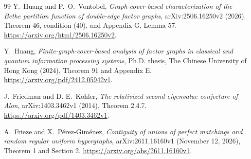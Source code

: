\begin{thebibliography}{99}
Y.~Huang and P.~O.~Vontobel,
\emph{Graph-cover-based characterization of the Bethe partition function
of double-edge factor graphs}, arXiv:2506.16250v2 (2026).
Theorem 46, condition (40), and Appendix G, Lemma 57.
\url{https://arxiv.org/html/2506.16250v2}.

Y.~Huang, \emph{Finite-graph-cover-based analysis of factor graphs in
classical and quantum information processing systems}, Ph.D. thesis,
The Chinese University of Hong Kong (2024), Theorem 91 and Appendix E.
\url{https://arxiv.org/pdf/2412.05942v1}.

J.~Friedman and D.-E.~Kohler,
\emph{The relativized second eigenvalue conjecture of Alon},
arXiv:1403.3462v1 (2014), Theorem 2.4.7.
\url{https://arxiv.org/pdf/1403.3462v1}.

A.~Frieze and X.~P\'erez-Gim\'enez,
\emph{Contiguity of unions of perfect matchings and random regular
uniform hypergraphs}, arXiv:2611.16160v1 (November 12, 2026),
Theorem 1 and Section 2.
\url{https://arxiv.org/abs/2611.16160v1}.

\end{thebibliography}
